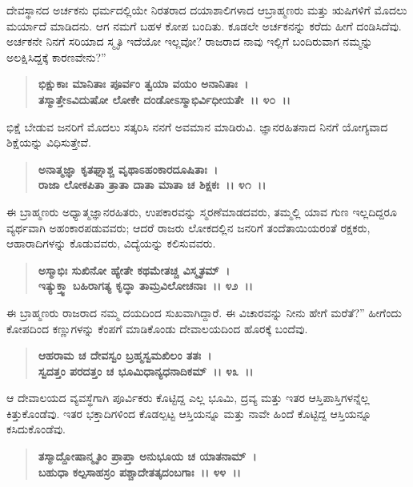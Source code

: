 ದೇವಸ್ಥಾನದ ಅರ್ಚಕನು ಧರ್ಮದಲ್ಲಿಯೇ ನಿರತರಾದ ದಯಾಶಾಲಿಗಳಾದ ಆ\break ಬ್ರಾಹ್ಮಣರು ಮತ್ತು ಋಷಿಗಳಿಗೆ ಮೊದಲು ಮರ್ಯಾದೆ ಮಾಡಿದನು. ಆಗ ನಮಗೆ ಬಹಳ ಕೋಪ ಬಂದಿತು. ಕೂಡಲೇ ಅರ್ಚಕನನ್ನು ಕರೆದು ಹೀಗೆ ದಂಡಿಸಿದೆವು. ಅರ್ಚಕನೇ ನಿನಗೆ ಸರಿಯಾದ ಸ್ಮೃತಿ ಇದೆಯೋ ಇಲ್ಲವೋ? ರಾಜರಾದ ನಾವು ಇಲ್ಲಿಗೆ ಬಂದಿರುವಾಗ ನಮ್ಮನ್ನು ಅಲಕ್ಷಿಸಿದ್ದಕ್ಕೆ ಕಾರಣವೇನು?”

\begin{verse}
\textbf{ಭಿಕ್ಷುಕಾಃ ಮಾನಿತಾಃ ಪೂರ್ವಂ ತ್ವಯಾ ವಯಂ ಅನಾನಿತಾಃ~।}\\\textbf{ತಸ್ಮಾತ್ತೇಽವಿದುಷೋ ಲೋಕೇ ದಂಡೋಽಸ್ಮಾಭಿರ್ವಿಧೀಯತೇ~।। ೪೦~।। }
\end{verse}

ಭಿಕ್ಷೆ ಬೇಡುವ ಜನರಿಗೆ ಮೊದಲು ಸತ್ಕರಿಸಿ ನನಗೆ ಅವಮಾನ ಮಾಡಿರುವಿ. ಜ್ಞಾನರಹಿತನಾದ ನಿನಗೆ ಯೋಗ್ಯವಾದ ಶಿಕ್ಷೆಯನ್ನು ವಿಧಿಸುತ್ತೇವೆ.

\begin{verse}
\textbf{ಅನಾತ್ಮಜ್ಞಾ ಕೃತಘ್ನಾಶ್ಚ ವೃಥಾಽಹಂಕಾರದೂಷಿತಾಃ~।}\\\textbf{ರಾಜಾ ಲೋಕಪಿತಾ ತ್ರಾತಾ ದಾತಾ ಮಾತಾ ಚ ಶಿಕ್ಷಕಃ~।। ೪೧~।। }
\end{verse}

ಈ ಬ್ರಾಹ್ಮಣರು ಅಧ್ಯಾತ್ಮಜ್ಞಾನರಹಿತರು, ಉಪಕಾರವನ್ನು ಸ್ಮರಣೆಮಾಡದವರು, ತಮ್ಮಲ್ಲಿ ಯಾವ ಗುಣ ಇಲ್ಲದಿದ್ದರೂ ವ್ಯರ್ಥವಾಗಿ ಅಹಂಕಾರಪಡುವವರು; ಆದರೆ ರಾಜರು ಲೋಕದಲ್ಲಿನ ಜನರಿಗೆ ತಂದೆತಾಯಿಯರಂತೆ ರಕ್ಷಕರು, ಆಹಾರಾದಿಗಳನ್ನು ಕೊಡುವವರು, ವಿದ್ಯೆಯನ್ನು ಕಲಿಸುವವರು.

\begin{verse}
\textbf{ಅಸ್ಮಾಭಿಃ ಸುಖಿನೋ ಹ್ಯೇತೇ ಕಥಮೇತಚ್ಚ ವಿಸ್ಮೃತಮ್~।}\\\textbf{ಇತ್ಯುಕ್ತ್ವಾ ಬಹಿರಾಗತ್ಯ ಕೃದ್ಧಾ ತಾಮ್ರವಿಲೋಚನಾಃ~।। ೪೨~।। }
\end{verse}

ಈ ಬ್ರಾಹ್ಮಣರು ರಾಜರಾದ ನಮ್ಮ ದಯದಿಂದ ಸುಖವಾಗಿದ್ದಾರೆ. ಈ ವಿಚಾರವನ್ನು ನೀನು ಹೇಗೆ ಮರೆತೆ?” ಹೀಗೆಂದು ಕೋಪದಿಂದ ಕಣ್ಣುಗಳನ್ನು ಕೆಂಪಗೆ ಮಾಡಿಕೊಂಡು ದೇವಾಲಯದಿಂದ ಹೊರಕ್ಕೆ ಬಂದೆವು.

\begin{verse}
\textbf{ಆಹರಾಮ ಚ ದೇವಸ್ವಂ ಬ್ರಹ್ಮಸ್ವಮಖಿಲಂ ತತಃ~।}\\\textbf{ಸ್ವದತ್ತಂ ಪರದತ್ತಂ ಚ ಭೂಮಿಧಾನ್ಯಧನಾದಿಕಮ್~।। ೪೩~।।} 
\end{verse}

ಆ ದೇವಾಲಯದ ವ್ಯವಸ್ಥೆಗಾಗಿ ಪೂರ್ವಿಕರು ಕೊಟ್ಟಿದ್ದ ಎಲ್ಲ ಭೂಮಿ, ದ್ರವ್ಯ ಮತ್ತು ಇತರ ಆಸ್ತಿಪಾಸ್ತಿಗಳನ್ನೆಲ್ಲ ಕಿತ್ತುಕೊಂಡೆವು. ಇತರ ಭಕ್ತಾದಿಗಳಿಂದ ಕೊಡಲ್ಪಟ್ಟ ಆಸ್ತಿಯನ್ನೂ ಮತ್ತು ನಾವೇ ಹಿಂದೆ ಕೊಟ್ಟಿದ್ದ ಆಸ್ತಿಯನ್ನೂ ಕಸಿದುಕೊಂಡೆವು.

\begin{verse}
\textbf{ತಸ್ಮಾದ್ದೋಷಾನ್ಮೃತಿಂ ಪ್ರಾಪ್ತಾ ಅನುಭೂಯ ಚ ಯಾತನಾಮ್~।}\\\textbf{ಬಹುಧಾ ಕಲ್ಪಸಾಹಸ್ರಂ ಪಶ್ಚಾದೇತತ್ಕದಂಬಗಾಃ~।। ೪೪~।। }
\end{verse}

